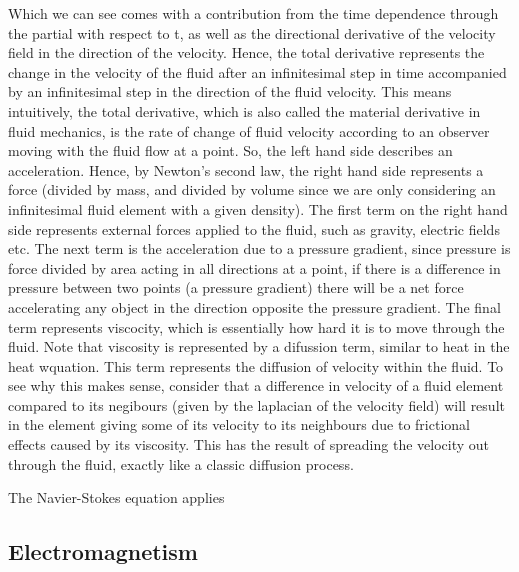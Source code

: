 \documentclass{article}
\begin{document}
Which we can see comes with a contribution from the time dependence through the partial with respect to t, as well as the directional derivative of the velocity field in the direction of the velocity. Hence, the total derivative represents the change in the velocity of the fluid after an infinitesimal step in time accompanied by an infinitesimal step in the direction of the fluid velocity. This means intuitively, the total derivative, which is also called the material derivative in fluid mechanics, is the rate of change of fluid velocity according to an observer moving with the fluid flow at a point. So, the left hand side describes an acceleration. Hence, by Newton's second law, the right hand side represents a force (divided by mass, and divided by volume since we are only considering an infinitesimal fluid element with a given density). The first term on the right hand side represents external forces applied to the fluid, such as gravity, electric fields etc. The next term is the acceleration due to a pressure gradient, since pressure is force divided by area acting in all directions at a point, if there is a difference in pressure between two points (a pressure gradient) there will be a net force accelerating any object in the direction opposite the pressure gradient. The final term represents viscocity, which is essentially how hard it is to move through the fluid. Note that viscosity is represented by a difussion term, similar to heat in the heat wquation. This term represents the diffusion of velocity within the fluid. To see why this makes sense, consider that a difference in velocity of a fluid element compared to its negibours (given by the laplacian of the velocity field) will result in the element giving some of its velocity to its neighbours due to frictional effects caused by its viscosity. This has the result of spreading the velocity out through the fluid, exactly like a classic diffusion process. 

The Navier-Stokes equation applies 


\subsection{Electromagnetism}
\end{document}
